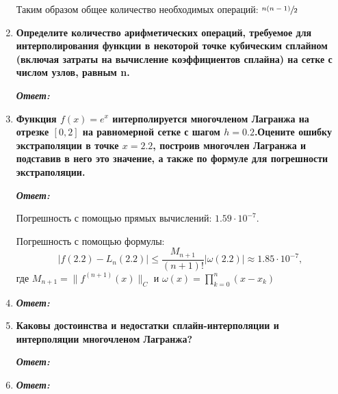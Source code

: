 \documentclass[12pt, a4paper]{article}
\newcommand{\norm}[1]{\lVert #1 \rVert}
\newcommand{\abs}[1]{\lvert #1 \rvert}
\begin{document}
\begin{enumerate}
	Таким образом общее количество необходимых операций: $\sfrac{n(n-1)}{2}$
	
	\item \textbf{Определите количество арифметических операций, требуемое для интерполирования функции в некоторой точке кубическим сплайном (включая затраты на вычисление коэффициентов сплайна) на сетке с числом узлов, равным n.}
	\vspace*{0.2cm}
	
	\textit{\textbf{Ответ:}}
	
	
		
	\item \textbf{Функция $f(x) = e ^ x$ интерполируется многочленом Лагранжа на отрезке $[0, 2]$ на равномерной сетке с шагом $h=0.2$.Оцените ошибку экстраполяции в точке $x = 2.2$, построив многочлен Лагранжа и подставив в него это значение, а также по формуле для погрешности экстраполяции.}
	\vspace*{0.2cm}

	\textit{\textbf{Ответ:}}
	
	Погрешность с помощью прямых вычислений: $1.59 \cdot 10^{-7}$.
	
	Погрешность с помощью формулы:
	\[
	\abs{f(2.2) - L_n(2.2)} \le \dfrac{M_{n+1}}{(n+1)!}\abs{\omega(2.2)} \approx 1.85 \cdot 10^{-7},
	\]
	где $M_{n+1} = \norm{f^{(n+1)}(x)}_C$ и $\omega(x) = \prod\limits_{k=0}^{n}(x - x_k)$
	
	\item \textbf{}
	\vspace*{0.2cm}
	
	\textit{\textbf{Ответ:}}
	
	\item \textbf{Каковы достоинства и недостатки сплайн-интерполяции и интерполяции многочленом Лагранжа?}
	\vspace*{0.2cm}
	
	\textit{\textbf{Ответ:}}
	
	\item \textbf{}
	\vspace*{0.2cm}
	
	\textit{\textbf{Ответ:}}
	\end{enumerate}
	



	
\end{document}
